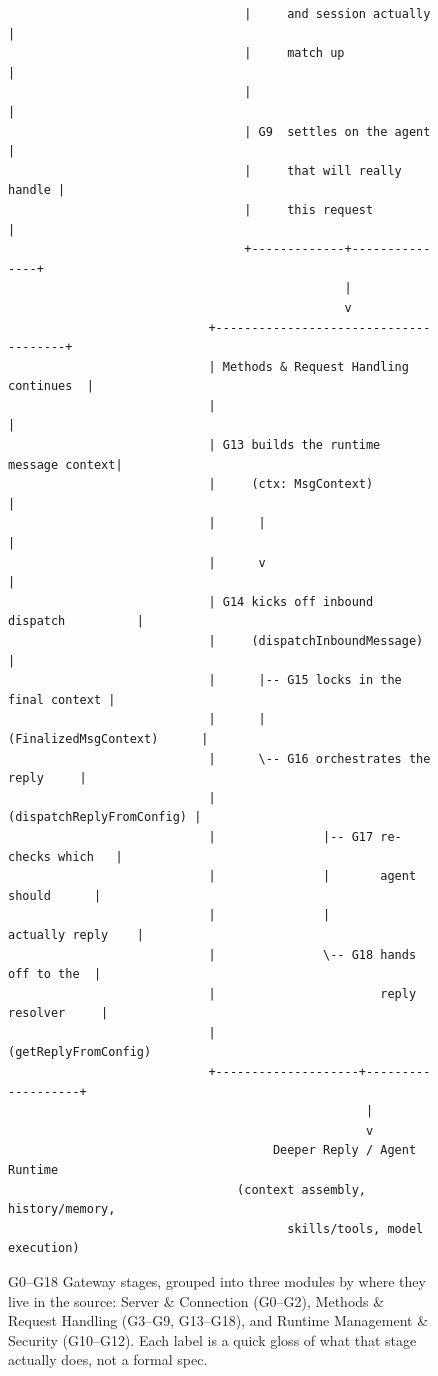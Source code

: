\begin{figure}[p]
{\begin{verbatim}
                                 |     and session actually    |
                                 |     match up                |
                                 |                            |
                                 | G9  settles on the agent    |
                                 |     that will really handle |
                                 |     this request             |
                                 +-------------+---------------+
                                               |
                                               v
                            +--------------------------------------+
                            | Methods & Request Handling continues  |
                            |                                        |
                            | G13 builds the runtime message context|
                            |     (ctx: MsgContext)                 |
                            |      |                                 |
                            |      v                                 |
                            | G14 kicks off inbound dispatch          |
                            |     (dispatchInboundMessage)           |
                            |      |-- G15 locks in the final context |
                            |      |       (FinalizedMsgContext)      |
                            |      \-- G16 orchestrates the reply     |
                            |              (dispatchReplyFromConfig) |
                            |               |-- G17 re-checks which   |
                            |               |       agent should      |
                            |               |       actually reply    |
                            |               \-- G18 hands off to the  |
                            |                       reply resolver     |
                            |                       (getReplyFromConfig)
                            +--------------------+-------------------+
                                                  |
                                                  v
                                     Deeper Reply / Agent Runtime
                                (context assembly, history/memory,
                                       skills/tools, model execution)
\end{verbatim}
}
\caption{
G0--G18 Gateway stages, grouped into three modules by where they live in
the source: Server \& Connection (G0--G2), Methods \& Request Handling
(G3--G9, G13--G18), and Runtime Management \& Security (G10--G12). Each
label is a quick gloss of what that stage actually does, not a formal
spec.
}
\label{fig:gateway-g0-g18-annotated}

\end{figure}

